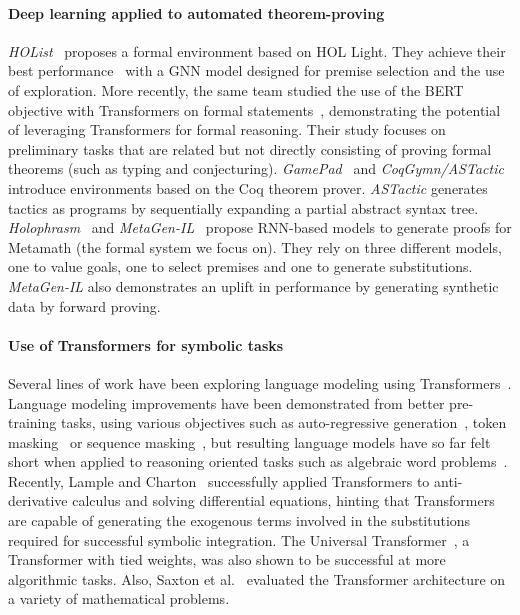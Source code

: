 \paragraph{Deep learning applied to automated theorem-proving} \textit{HOList}~\cite{bansal2019holist} proposes a formal environment based on HOL Light. They achieve their best performance~\cite{bansal2019learning} with a GNN model designed for premise selection and the use of exploration. More recently, the same team studied the use of the BERT objective with Transformers on formal statements~\cite{rabe2020language}, demonstrating the potential of leveraging Transformers for formal reasoning. Their study focuses on preliminary tasks that are related but not directly consisting of proving formal theorems (such as typing and conjecturing). \textit{GamePad}~\cite{huang2018gamepad} and \textit{CoqGymn/ASTactic}~\cite{yang2019learning} introduce environments based on the Coq theorem prover. \textit{ASTactic} generates tactics as programs by sequentially expanding a partial abstract syntax tree. \textit{Holophrasm}~\cite{whalen2016holophrasm} and \textit{MetaGen-IL}~\cite{wang2020learning} propose RNN-based models to generate proofs for Metamath (the formal system we focus on). They rely on three different models, one to value goals, one to select premises and one to generate substitutions. \textit{MetaGen-IL} also demonstrates an uplift in performance by generating synthetic data by forward proving. 

\paragraph{Use of Transformers for symbolic tasks} Several lines of work have been exploring language modeling using Transformers~\cite{vaswani2017attention}. Language modeling improvements have been demonstrated from better pre-training tasks, using various objectives such as auto-regressive generation~\cite{radford2018improving,radford2019language,brown2020language}, token masking~\cite{devlin2018bert} or sequence masking~\cite{raffel2019exploring}, but resulting language models have so far felt short when applied to reasoning oriented tasks such as algebraic word problems~\cite{ling2017program,amini2019mathqa}. Recently, Lample and Charton~\cite{lample2019deep} successfully applied Transformers to anti-derivative calculus and solving differential equations, hinting that Transformers are capable of generating the exogenous terms involved in the substitutions required for successful symbolic integration. The Universal Transformer~\cite{dehghani2018universal}, a Transformer with tied weights, was also shown to be successful at more algorithmic tasks. Also, Saxton et al.~\cite{saxton2019analysing} evaluated the Transformer architecture on a variety of mathematical problems.

